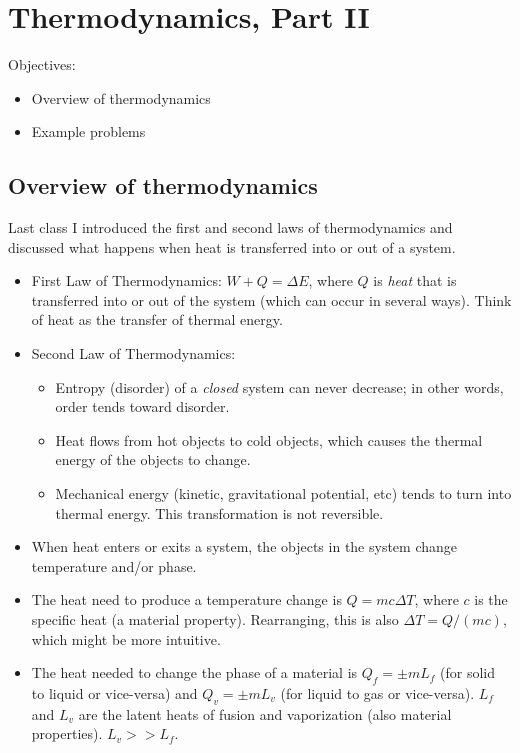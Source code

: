 \section{Thermodynamics, Part II}
Objectives:
\begin{itemize}
\item Overview of thermodynamics
\item Example problems
\end{itemize}

\subsection{Overview of thermodynamics}
Last class I introduced the first and second laws of thermodynamics and discussed what happens when heat is transferred into or out of a system.
\begin{itemize}
\item First Law of Thermodynamics: $W+Q=\Delta{E}$, where $Q$ is \textit{heat} that is transferred into or out of the system (which can occur in several ways). Think of heat as the transfer of thermal energy.
\item Second Law of Thermodynamics: 
	\begin{itemize}
	\item Entropy (disorder) of a \textit{closed} system can never decrease; in other words, order tends toward disorder.
	\item Heat flows from hot objects to cold objects, which causes the thermal energy of the objects to change.
	\item Mechanical energy (kinetic, gravitational potential, etc) tends to turn into thermal energy. This transformation is not reversible.
	\end{itemize}
\item When heat enters or exits a system, the objects in the system change temperature and/or phase.
\item The heat need to produce a temperature change is $Q=mc\Delta{T}$, where $c$ is the specific heat (a material property). Rearranging, this is also $\Delta{T}=Q/(mc)$, which might be more intuitive.
\item The heat needed to change the phase of a material is $Q_f=\pm mL_f$ (for solid to liquid or vice-versa) and $Q_v=\pm mL_v$ (for liquid to gas or vice-versa). $L_f$ and $L_v$ are the latent heats of fusion and vaporization (also material properties). $L_v>>L_f$.
\end{itemize}

